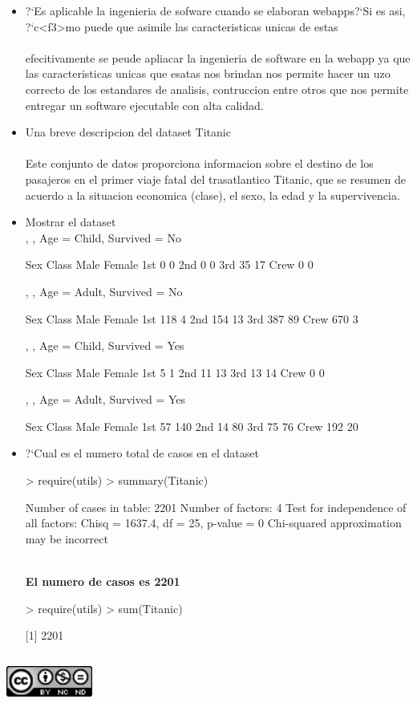 \documentclass[9pt]{article}
\begin{document}
\begin{itemize}
		\item ?`Es aplicable la ingenieria de sofware cuando se elaboran webapps?`Si es asi, ?`c<f3>mo puede que asimile las caracteristicas unicas de estas\\\\
	efecitivamente se peude apliacar la ingenieria de software en la webapp ya que las caracteristicas unicas que esatas nos brindan nos permite hacer un uzo correcto de los estandares de analisis, contruccion entre otros que nos permite entregar un software ejecutable con alta calidad. 
	
	
     \item Una breve descripcion del dataset Titanic\\\\
     Este conjunto de datos proporciona informacion sobre el destino de los pasajeros en el primer viaje fatal del trasatlantico Titanic, que se resumen de acuerdo a la situacion economica (clase), el sexo, la edad y la supervivencia.
     
   
     
	\item Mostrar el dataset\\
, , Age = Child, Survived = No

      Sex
Class  Male Female
  1st     0      0
  2nd     0      0
  3rd    35     17
  Crew    0      0

, , Age = Adult, Survived = No

      Sex
Class  Male Female
  1st   118      4
  2nd   154     13
  3rd   387     89
  Crew  670      3

, , Age = Child, Survived = Yes

      Sex
Class  Male Female
  1st     5      1
  2nd    11     13
  3rd    13     14
  Crew    0      0

, , Age = Adult, Survived = Yes

      Sex
Class  Male Female
  1st    57    140
  2nd    14     80
  3rd    75     76
  Crew  192     20	
	\item ?`Cual es el numero total de casos en el dataset\\
	
\begin{Schunk}
\begin{Sinput}
> require(utils)
> summary(Titanic)
\end{Sinput}
Number of cases in table: 2201 
Number of factors: 4 
Test for independence of all factors:
	Chisq = 1637.4, df = 25, p-value = 0
	Chi-squared approximation may be incorrect\end{Schunk}
\\
 \textbf{El numero de casos es 2201}
\begin{Schunk}
\begin{Sinput}
> require(utils)
> sum(Titanic)
\end{Sinput}
[1] 2201\end{Schunk}

\end{itemize}


\newpage
\begin{center}
	\includegraphics [width=80pt,height=50pt]{creative}\\
\end{center}	
\end{document}
